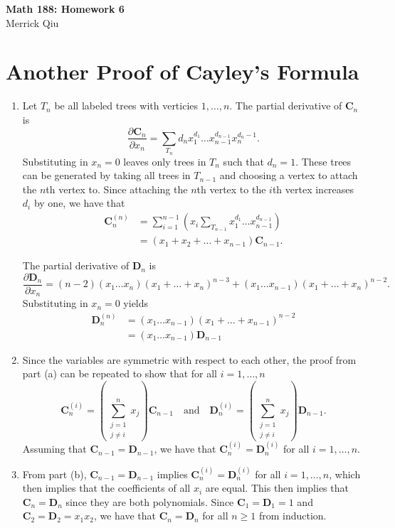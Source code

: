 \documentclass{article}
\newcommand{\Cn}{\textbf{C}_n}
\newcommand{\Dn}{\textbf{D}_n}
\begin{document}
\begin{center}
	\huge{\bf Math 188: Homework 6} \\
	Merrick Qiu
\end{center}

\section{Another Proof of Cayley's Formula}
\begin{enumerate}
   \item Let $T_n$ be all labeled trees with verticies $1,\hdots, n$.
      The partial derivative of $\Cn$ is
      \[
         \frac{\partial \Cn}{\partial x_n} 
         = \sum_{T_n} d_n x_1^{d_1}\hdots x_{n-1}^{d_{n-1}}x_n^{d_n-1}.
      \]
      Substituting in $x_n = 0$ leaves only trees in $T_n$ such that $d_n = 1$.
      These trees can be generated by taking all trees in $T_{n-1}$ and choosing
      a vertex to attach the $n$th vertex to.
      Since attaching the $n$th vertex to the $i$th vertex increases $d_i$ by one,
      we have that 
      \begin{align*}
         \Cn^{(n)}
         &= \sum_{i=1}^{n-1} \left(x_i\sum_{T_{n-1}} x_1^{d_1}\hdots x_{n-1}^{d_{n-1}}\right) \\
         &= (x_1 + x_2 + \hdots + x_{n-1}) \textbf{C}_{n-1}.
      \end{align*}

      The partial derivative of $\Dn$ is
      \[
         \frac{\partial \Dn}{\partial x_n} 
         = (n-2)(x_1\hdots x_n)(x_1 + \hdots + x_n)^{n-3} + 
         (x_1\hdots x_{n-1})(x_1 + \hdots + x_n)^{n-2}.
      \]
      Substituting in $x_n = 0$ yields
      \begin{align*}
         \Dn^{(n)}
         &= (x_1\hdots x_{n-1})(x_1 + \hdots + x_{n-1})^{n-2} \\
         &= (x_1\hdots x_{n-1})\textbf{D}_{n-1}
      \end{align*}
   \item Since the variables are symmetric with respect to each other,
      the proof from part (a) can be repeated to show 
      that for all $i=1,\hdots,n$
      \[
         \Cn^{(i)} = \left(\sum_{\substack{j=1 \\ j\neq i}}^n x_j\right) \textbf{C}_{n-1} 
         \quad \text{and} \quad
         \Dn^{(i)} = \left(\sum_{\substack{j=1 \\ j\neq i}}^n x_j\right) \textbf{D}_{n-1}.
      \]
      Assuming that $\textbf{C}_{n-1} = \textbf{D}_{n-1}$, 
      we have that $\Cn^{(i)} = \Dn^{(i)}$ for all $i=1,\hdots,n$.
   \item 
      From part (b), $\textbf{C}_{n-1} = \textbf{D}_{n-1}$ implies 
      $\Cn^{(i)} = \Dn^{(i)}$ for all $i=1,\hdots,n$,
      which then implies that the 
      coefficients of all $x_i$ are equal.
      This then implies that
      $\Cn = \Dn$ since they are both polynomials.
      Since $\textbf{C}_1 = \textbf{D}_1 = 1$ and 
      $\textbf{C}_2 = \textbf{D}_2 = x_1x_2$, we have that 
      $\Cn = \Dn$ for all $n \geq 1$ from induction.
   \end{enumerate}
   \newpage
\end{document}
